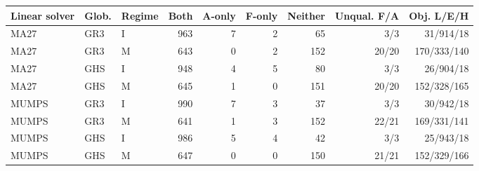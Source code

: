 \begin{tabular}{@{}lllrrrrrr@{}}
\toprule
Linear solver & Glob. & Regime & Both & A-only & F-only & Neither & Unqual. F/A & Obj. L/E/H\\
\midrule
MA27 & GR3 & I & 963 & 7 & 2 & 65 & 3/3 & 31/914/18\\
MA27 & GR3 & M & 643 & 0 & 2 & 152 & 20/20 & 170/333/140\\
MA27 & GHS & I & 948 & 4 & 5 & 80 & 3/3 & 26/904/18\\
MA27 & GHS & M & 645 & 1 & 0 & 151 & 20/20 & 152/328/165\\
MUMPS & GR3 & I & 990 & 7 & 3 & 37 & 3/3 & 30/942/18\\
MUMPS & GR3 & M & 641 & 1 & 3 & 152 & 22/21 & 169/331/141\\
MUMPS & GHS & I & 986 & 5 & 4 & 42 & 3/3 & 25/943/18\\
MUMPS & GHS & M & 647 & 0 & 0 & 150 & 21/21 & 152/329/166\\
\bottomrule
\end{tabular}
